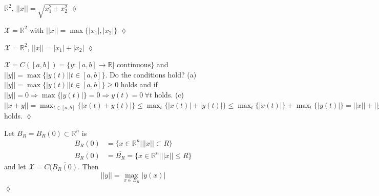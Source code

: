 \begin{example}
$\mathbb{R}^2$, $||x||=\sqrt{x_1^2+x_2^2}$
$\lozenge$
\end{example}

\begin{example}
$\mathcal{X}=\mathbb{R}^2$ with $||x|| = \max\{|x_1|,|x_2|\}$
$\lozenge$
\end{example}

\begin{example}
$\mathcal{X} = \mathbb{R}^2$, $||x||=|x_1|+|x_2|$
$\lozenge$
\end{example}

\begin{example}
$\mathcal{X} = C([a,b]) = \{y:[a,b]\to\mathbb{R} | \text{ continuous}\}$ and $||y|| = \max\{|y(t)| | t\in[a,b]\}$. Do the conditions hold?
\newline
(a) $||y|| = \max\{|y(t)| | t\in[a,b]\}\geq 0$ holds and if $||y||=0 \Rightarrow \max\{|y(t)|\} = 0 \Rightarrow y(t)=0 ~\forall t$ holds.
\newline
(c) $||x+y|| = \max_{t\in[a,b]}\{|x(t)+y(t)|\} \leq \max_t\{|x(t)|+|y(t)|\} \leq \max_t\{|x(t)|\} + \max_t\{|y(t)|\} = ||x|| + ||y||$ holds.
$\lozenge$
\end{example}

\begin{example}
Let $B_R=B_R(0)\subset\mathbb{R}^n$ is
\begin{align*}
B_R(0) &= \{x\in\mathbb{R}^n | ||x||\subset R\} \\
\overline{B_R(0)} &= \overline{B_R} = \{x\in\mathbb{R}^n | ||x||\leq R\}
\end{align*}
and let $\mathcal{X}=C(\overline{B_R(0)}$. Then
$$||y||=\max_{x\in B_R} |y(x)|$$
$\lozenge$
\end{example}

